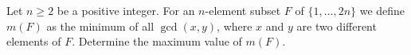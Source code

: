 Let $n \geq 2$ be a positive integer. For an $n$-element subset $F$ of $\{1, \ldots, 2n\}$ we define $m(F)$ as the minimum of all $\gcd{(x,y)}$, where $x$ and $y$ are two different elements of $F$. Determine the maximum value of $m(F)$.
